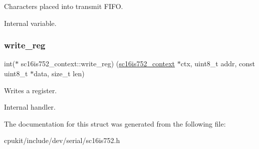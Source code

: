 Characters placed into transmit F\+I\+FO. 

Internal variable. \mbox{\label{structsc16is752__context_a919565fc80951588835d47031c70ceb3}} 
\subsubsection{\texorpdfstring{write\_reg}{write\_reg}}
{\footnotesize\ttfamily int($\ast$ sc16is752\+\_\+context\+::write\+\_\+reg) (\mbox{\hyperlink{structsc16is752__context}{sc16is752\+\_\+context}} $\ast$ctx, uint8\+\_\+t addr, const uint8\+\_\+t $\ast$data, size\+\_\+t len)}



Writes a register. 

Internal handler. 

The documentation for this struct was generated from the following file\+:\begin{DoxyCompactItemize}
\item 
cpukit/include/dev/serial/sc16is752.\+h\end{DoxyCompactItemize}
